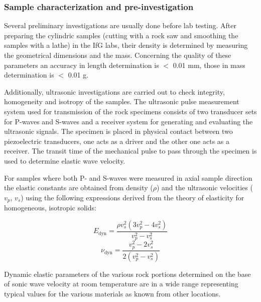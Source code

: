 \subsubsection{Sample characterization and pre-investigation}

Several preliminary investigations are usually done before lab testing. After preparing the cylindric samples (cutting with a rock saw and smoothing the samples with a lathe) in the IfG labs, their density is determined by measuring the geometrical dimensions and the mass. Concerning the quality of these parameters an accuracy in length determination is $<$ 0.01 mm, those in mass determination is $<$ 0.01 g. 

Additionally, ultrasonic investigations are carried out to check integrity, homogeneity and isotropy of the samples. The ultrasonic pulse measurement system used for transmission of the rock specimens consists of two transducer sets for P-waves and S-waves and a receiver system for generating and evaluating the ultrasonic signals. The specimen is placed in physical contact between two piezoelectric transducers, one acts as a driver and the other one acts as a receiver. The transit time of the mechanical pulse to pass through the specimen is used to determine elastic wave velocity.

For samples where both P- and S-waves were measured in axial sample direction the elastic constants are obtained from density ($\rho$) and the ultrasonic velocities ($v_p$, $v_s$) using the following expressions derived from the theory of elasticity for homogeneous, isotropic solids:

\begin{equation}
\label{eq:YoungsModulus_Ultrasonic}
E_\text{dyn} = \frac{\rho v_s^2(3v_p^2-4v_s^2)}{v_p^2-v_s^2} 
\end{equation}
\begin{equation}
\label{eq:PoissonsRatio_Ultrasonic}
\nu_\text{dyn} = \frac{v_p^2-2v_s^2}{2(v_p^2-v_s^2)}
\end{equation}

Dynamic elastic parameters of the various rock portions determined on the base of sonic wave velocity at room temperature are in a wide range representing typical values for the various materials as known from other locations. 
